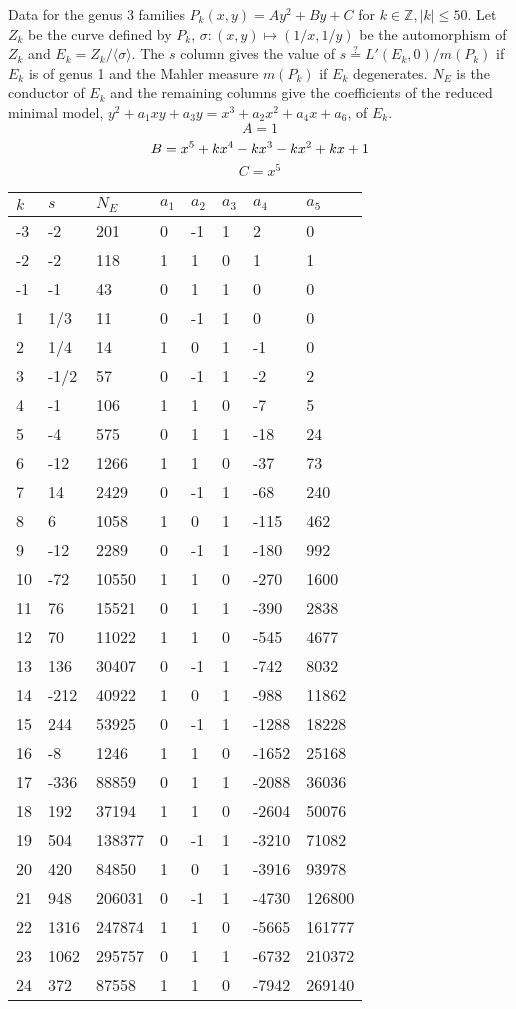 \documentclass{amsart}
\begin{document}
Data for the genus 3 families $P_k(x,y)=Ay^2+By+C$ for $k\in \mathbb{Z}, |k|\leqslant 50$. Let $Z_k$ be the curve defined by $P_k$, $\sigma:(x,y)\mapsto(1/x,1/y)$ be the automorphism of $Z_k$ and $E_k=Z_k/\langle\sigma\rangle$. The $s$ column gives the value of $s\stackrel{?}{=}L'(E_k,0)/m(P_k)$ if $E_k$ is of genus 1 and the Mahler measure $m(P_k)$ if $E_k$ degenerates. $N_E$ is the conductor of $E_k$ and the remaining columns give the coefficients of the reduced minimal model, $y^2+a_1xy+a_3y=x^3+a_2x^2+a_4x+a_6$, of $E_k$.
$$A=1$$
$$B=x^5
 + k\*x^4
 - k\*x^3
 - k\*x^2
 + k\*x
 + 1$$
$$C=x^5$$
\begin{longtable}{|l|l|l|lllll|}
\hline
$k$ & $s$ & $N_E$ & $a_1$ & $a_2$ & $a_3$ & $a_4$ & $a_5$\\
\hline
-3&-2&201&0&-1&1&2&0\\
-2&-2&118&1&1&0&1&1\\
-1&-1&43&0&1&1&0&0\\
1&1/3&11&0&-1&1&0&0\\
2&1/4&14&1&0&1&-1&0\\
3&-1/2&57&0&-1&1&-2&2\\
4&-1&106&1&1&0&-7&5\\
5&-4&575&0&1&1&-18&24\\
6&-12&1266&1&1&0&-37&73\\
7&14&2429&0&-1&1&-68&240\\
8&6&1058&1&0&1&-115&462\\
9&-12&2289&0&-1&1&-180&992\\
10&-72&10550&1&1&0&-270&1600\\
11&76&15521&0&1&1&-390&2838\\
12&70&11022&1&1&0&-545&4677\\
13&136&30407&0&-1&1&-742&8032\\
14&-212&40922&1&0&1&-988&11862\\
15&244&53925&0&-1&1&-1288&18228\\
16&-8&1246&1&1&0&-1652&25168\\
17&-336&88859&0&1&1&-2088&36036\\
18&192&37194&1&1&0&-2604&50076\\
19&504&138377&0&-1&1&-3210&71082\\
20&420&84850&1&0&1&-3916&93978\\
21&948&206031&0&-1&1&-4730&126800\\
22&1316&247874&1&1&0&-5665&161777\\
23&1062&295757&0&1&1&-6732&210372\\
24&372&87558&1&1&0&-7942&269140\\

\end{longtable}
\end{document}

